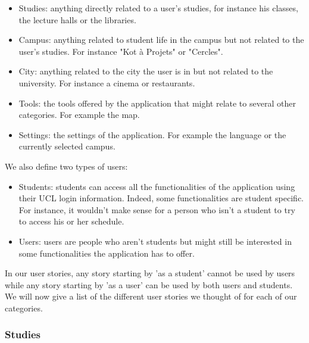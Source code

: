 \documentclass[11pt, a4paper]{report}
\begin{document}
\begin{itemize}

\item Studies: anything directly related to a user's studies, for instance his classes, the lecture halls or the libraries.
\item Campus: anything related to student life in the campus but not related to the user's studies. For instance "Kot à Projets" or "Cercles".
\item City: anything related to the city the user is in but not related to the university. For instance a cinema or restaurants.
\item Tools: the tools offered by the application that might relate to several other categories. For example the map.
\item Settings: the settings of the application. For example the language or the currently selected campus.

\end{itemize}

We also define two types of users:

\begin{itemize}

\item Students: students can access all the functionalities of the application using their UCL login information. Indeed, some functionalities are student specific. For instance, it wouldn't make sense for a person who isn't a student to try to access his or her schedule.

\item Users: users are people who aren't students but might still be interested in some functionalities the application has to offer. 

\end{itemize}

In our user stories, any story starting by 'as a student' cannot be used by users while any story starting by 'as a user' can be used by both users and students.\\

We will now give a list of the different user stories we thought of for each of our categories.

\subsubsection{Studies}
\end{document}

